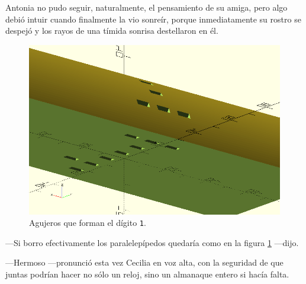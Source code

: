   Antonia no pudo seguir, naturalmente, el pensamiento de su amiga,
  pero algo debió intuir cuando finalmente la vio sonreír, porque
  inmediatamente su rostro se despejó y los rayos de una tímida
  sonrisa destellaron en él.

    \begin{figure}[t]
    \centering
    \includegraphics[width=.7\textwidth]{imagenes/digito-corte-4}
    \caption{Agujeros que forman el dígito \texttt{1}.}
    \label{fig:digito-corte-limpio}
  \end{figure}

  ---Si borro efectivamente los paralelepípedos quedaría como en la
  figura \ref{fig:digito-corte-limpio} ---dijo.


  ---Hermoso ---pronunció esta vez Cecilia en voz alta, con la
  seguridad de que juntas podrían hacer no sólo un reloj, sino un
  almanaque entero si hacía falta.



